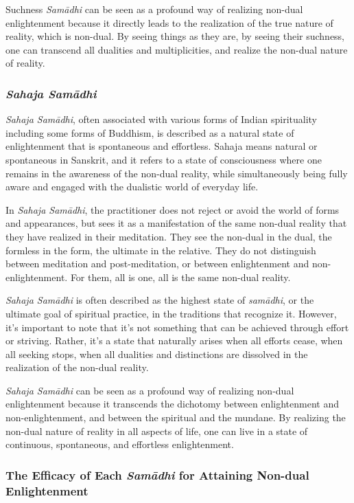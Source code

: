 \documentclass[12pt,openany]{book}
\begin{document}
Suchness \textit{Samādhi} can be seen as a profound way of realizing non-dual enlightenment because it directly leads to the realization of the true nature of reality, which is non-dual. By seeing things as they are, by seeing their suchness, one can transcend all dualities and multiplicities, and realize the non-dual nature of reality.

\subsubsection*{\textit{Sahaja Samādhi}}

\textit{Sahaja Samādhi}, often associated with various forms of Indian spi\-rituality including some forms of Buddhism, is described as a natural state of enlightenment that is spontaneous and effortless. Sahaja means natural or spontaneous in Sanskrit, and it refers to a state of consciousness where one remains in the awareness of the non-dual reality, while simultaneously being fully aware and engaged with the dualistic world of everyday life.

In \textit{Sahaja Samādhi}, the practitioner does not reject or avoid the world of forms and appearances, but sees it as a manifestation of the same non-dual reality that they have realized in their meditation. They see the non-dual in the dual, the formless in the form, the ultimate in the relative. They do not distinguish between meditation and post-meditation, or between enlightenment and non-enlightenment. For them, all is one, all is the same non-dual reality.

\textit{Sahaja Samādhi} is often described as the highest state of \textit{samā\-dhi}, or the ultimate goal of spiritual practice, in the traditions that recognize it. However, it's important to note that it's not something that can be achieved through effort or striving. Rather, it's a state that naturally arises when all efforts cease, when all seeking stops, when all dualities and distinctions are dissolved in the realization of the non-dual reality.

\textit{Sahaja Samādhi} can be seen as a profound way of realizing non-dual enlightenment because it transcends the dichotomy between enlightenment and non-enlightenment, and between the spiritual and the mundane. By realizing the non-dual nature of reality in all aspects of life, one can live in a state of continuous, spontaneous, and effortless enlightenment.

\subsubsection*{The Efficacy of Each \textit{Samādhi} for Attaining Non-dual Enlightenment}
\end{document}
